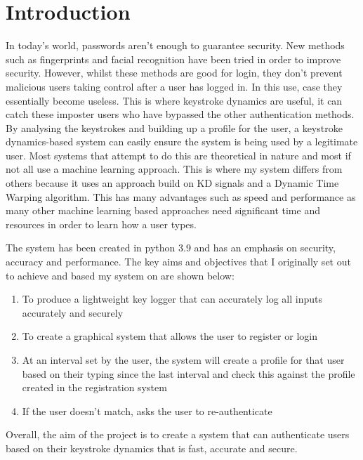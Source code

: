 \documentclass[10pt,a4paper]{report}
\begin{document}
\tableofcontents

\chapter{Introduction}
\setcounter{page}{1}

In today's world, passwords aren't enough to guarantee security. New methods such as fingerprints and facial recognition have been tried in order to improve security. However, whilst these methods are good for login, they don't prevent malicious users taking control after a user has logged in. In this use, case they essentially become useless. This is where keystroke dynamics are useful, it can catch these imposter users who have bypassed the other authentication methods. By analysing the keystrokes and building up a profile for the user, a keystroke dynamics-based system can easily ensure the system is being used by a legitimate user. Most systems that attempt to do this are theoretical in nature and most if not all use a machine learning approach. This is where my system differs from others because it uses an approach build on KD signals and a Dynamic Time Warping algorithm. This has many advantages such as speed and performance as many other machine learning based approaches need significant time and resources in order to learn how a user types.

The system has been created in python 3.9 and has an emphasis on security, accuracy and performance. The key aims and objectives that I originally set out to achieve and based my system on are shown below:

\begin{enumerate}
	\item To produce a lightweight key logger that can accurately log all inputs accurately and securely
	\item To create a graphical system that allows the user to register or login
	\item At an interval set by the user, the system will create a profile for that user based on their typing since the last interval and check this against the profile created in the registration system
	\item If the user doesn't match, asks the user to re-authenticate
\end{enumerate}

Overall, the aim of the project is to create a system that can authenticate users based on their keystroke dynamics that is fast, accurate and secure.
\end{document}
